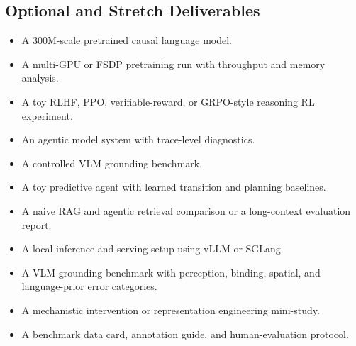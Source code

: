 \documentclass[11pt]{article}
\begin{document}
\subsection*{Optional and Stretch Deliverables}

\begin{itemize}
    \item A 300M-scale pretrained causal language model.
    \item A multi-GPU or FSDP pretraining run with throughput and memory analysis.
    \item A toy RLHF, PPO, verifiable-reward, or GRPO-style reasoning RL experiment.
    \item An agentic model system with trace-level diagnostics.
    \item A controlled VLM grounding benchmark.
    \item A toy predictive agent with learned transition and planning baselines.
    \item A naive RAG and agentic retrieval comparison or a long-context evaluation report.
    \item A local inference and serving setup using vLLM or SGLang.
    \item A VLM grounding benchmark with perception, binding, spatial, and language-prior error categories.
    \item A mechanistic intervention or representation engineering mini-study.
    \item A benchmark data card, annotation guide, and human-evaluation protocol.
\end{itemize}
\end{document}
